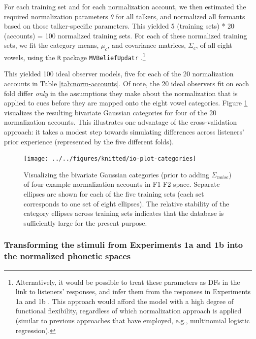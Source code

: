 \documentclass[preprint]{JASA}
\begin{document}
For each training set and for each normalization account, we then estimated the required normalization parameters \(\theta\) for all talkers, and normalized all formants based on those talker-specific parameters. This yielded 5 (training sets) * 20 (accounts) = 100 normalized training sets. For each of these normalized training sets, we fit the category means, \(\mu_c\), and covariance matrices, \(\Sigma_c\), of all eight vowels, using the \texttt{R} package \texttt{MVBeliefUpdatr} \citep{R-MVBeliefUpdatr}.\footnote{Alternatively, it would be possible to treat these parameters as DFs in the link to listeners' responses, and infer them from the responses in Experiments 1a and 1b \citep[cf.,][]{kleinschmidt-jaeger2016}. This approach would afford the model with a high degree of functional flexibility, regardless of which normalization approach is applied (similar to previous approaches that have employed, e.g., multinomial logistic regression).}

This yielded 100 ideal observer models, five for each of the 20 normalization accounts in Table \ref{tab:norm-accounts}. Of note, the 20 ideal observers fit on each fold differ \emph{only} in the assumptions they make about the normalization that is applied to cues before they are mapped onto the eight vowel categories. Figure \ref{fig:io-plot-categories} visualizes the resulting bivariate Gaussian categories for four of the 20 normalization accounts. This illustrates one advantage of the cross-validation approach: it takes a modest step towards simulating differences across listeners' prior experience (represented by the five different folds).



\begin{figure}[!ht]

{\centering \texttt{[image: ../../figures/knitted/io-plot-categories]} 

}

\caption{Visualizing the bivariate Gaussian categories (prior to adding \(\Sigma_{noise}\)) of four example normalization accounts in F1-F2 space. Separate ellipses are shown for each of the five training sets (each set corresponds to one set of eight ellipses). The relative stability of the category ellipses across training sets indicates that the database is sufficiently large for the present purpose.}\label{fig:io-plot-categories}
\end{figure}

\subsubsection{Transforming the stimuli from Experiments 1a and 1b into the normalized phonetic spaces}\label{transforming-the-stimuli-from-experiments-1a-and-1b-into-the-normalized-phonetic-spaces}
\end{document}
